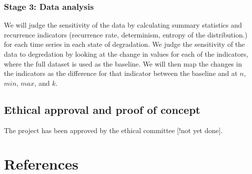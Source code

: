 \documentclass[
  letterpaper,
  DIV=11,
  numbers=noendperiod]{scrartcl}
\begin{document}
\hypertarget{stage-3-data-analysis}{%
\subsubsection{Stage 3: Data analysis}\label{stage-3-data-analysis}}

We will judge the sensitivity of the data by calculating summary
statistics and recurrence indicators (recurrence rate, determinism,
entropy of the distribution.) for each time series in each state of
degradation. We judge the sensitivity of the data to degredation by
looking at the change in values for each of the indicators, where the
full dataset is used as the baseline. We will then map the changes in
the indicators as the difference for that indicator between the baseline
and at \(n\), \(min\), \(max\), and \(k\).

\hypertarget{ethical-approval-and-proof-of-concept}{%
\subsection{Ethical approval and proof of
concept}\label{ethical-approval-and-proof-of-concept}}

The project has been approved by the ethical committee {[}!not yet
done{]}.

\hypertarget{references}{%
\section{References}\label{references}}
\end{document}
